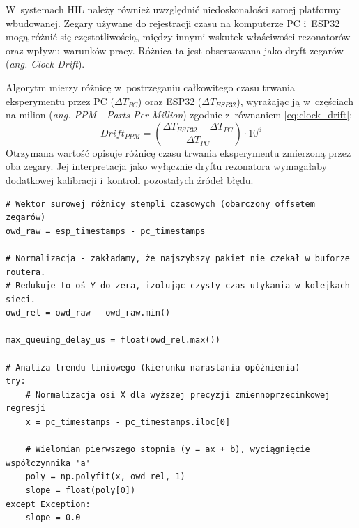 W~systemach HIL należy również uwzględnić niedoskonałości samej platformy wbudowanej.
Zegary używane do rejestracji czasu na komputerze PC i~ESP32 mogą różnić się częstotliwością, między innymi wskutek właściwości rezonatorów oraz wpływu warunków pracy.
Różnica ta jest obserwowana jako dryft zegarów (\textit{ang. Clock Drift}).

Algorytm mierzy różnicę w~postrzeganiu całkowitego czasu trwania eksperymentu przez PC ($\Delta T_{PC}$) oraz ESP32 ($\Delta T_{ESP32}$), wyrażając ją w~częściach na milion (\textit{ang. PPM - Parts Per Million}) zgodnie z~równaniem \ref{eq:clock_drift}:
\begin{equation}
    Drift_{PPM} = \left( \frac{\Delta T_{ESP32} - \Delta T_{PC}}{\Delta T_{PC}} \right) \cdot 10^6 \label{eq:clock_drift} \end{equation} Otrzymana wartość opisuje różnicę czasu trwania eksperymentu zmierzoną przez oba zegary.
Jej interpretacja jako wyłącznie dryftu rezonatora wymagałaby dodatkowej kalibracji i~kontroli pozostałych źródeł błędu.

\begin{listing}[htbp]
    \caption{Wektorowa redukcja błędu synchronizacji oraz analiza regresji liniowej za pomocą biblioteki NumPy (\texttt{timing\_trends.py}) \cite{espy_nexus_python_host}.}
    \label{lst:timing_trends}
    \begin{verbatim}
# Wektor surowej różnicy stempli czasowych (obarczony offsetem zegarów)
owd_raw = esp_timestamps - pc_timestamps

# Normalizacja - zakładamy, że najszybszy pakiet nie czekał w buforze routera.
# Redukuje to oś Y do zera, izolując czysty czas utykania w kolejkach sieci.
owd_rel = owd_raw - owd_raw.min()

max_queuing_delay_us = float(owd_rel.max())

# Analiza trendu liniowego (kierunku narastania opóźnienia)
try:
    # Normalizacja osi X dla wyższej precyzji zmiennoprzecinkowej regresji
    x = pc_timestamps - pc_timestamps.iloc[0]
    
    # Wielomian pierwszego stopnia (y = ax + b), wyciągnięcie współczynnika 'a'
    poly = np.polyfit(x, owd_rel, 1)
    slope = float(poly[0])
except Exception:
    slope = 0.0
\end{verbatim}
\end{listing}
